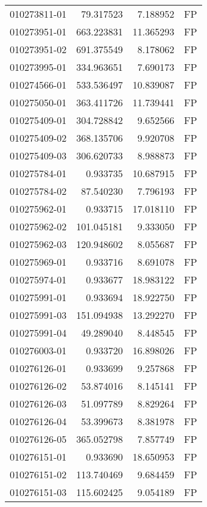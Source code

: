 \begin{tabular}{lrrl}
010273811-01 &   79.317523 &       7.188952 &   FP \\
010273951-01 &  663.223831 &      11.365293 &   FP \\
010273951-02 &  691.375549 &       8.178062 &   FP \\
010273995-01 &  334.963651 &       7.690173 &   FP \\
010274566-01 &  533.536497 &      10.839087 &   FP \\
010275050-01 &  363.411726 &      11.739441 &   FP \\
010275409-01 &  304.728842 &       9.652566 &   FP \\
010275409-02 &  368.135706 &       9.920708 &   FP \\
010275409-03 &  306.620733 &       8.988873 &   FP \\
010275784-01 &    0.933735 &      10.687915 &   FP \\
010275784-02 &   87.540230 &       7.796193 &   FP \\
010275962-01 &    0.933715 &      17.018110 &   FP \\
010275962-02 &  101.045181 &       9.333050 &   FP \\
010275962-03 &  120.948602 &       8.055687 &   FP \\
010275969-01 &    0.933716 &       8.691078 &   FP \\
010275974-01 &    0.933677 &      18.983122 &   FP \\
010275991-01 &    0.933694 &      18.922750 &   FP \\
010275991-03 &  151.094938 &      13.292270 &   FP \\
010275991-04 &   49.289040 &       8.448545 &   FP \\
010276003-01 &    0.933720 &      16.898026 &   FP \\
010276126-01 &    0.933699 &       9.257868 &   FP \\
010276126-02 &   53.874016 &       8.145141 &   FP \\
010276126-03 &   51.097789 &       8.829264 &   FP \\
010276126-04 &   53.399673 &       8.381978 &   FP \\
010276126-05 &  365.052798 &       7.857749 &   FP \\
010276151-01 &    0.933690 &      18.650953 &   FP \\
010276151-02 &  113.740469 &       9.684459 &   FP \\
010276151-03 &  115.602425 &       9.054189 &   FP \\

\end{tabular}
